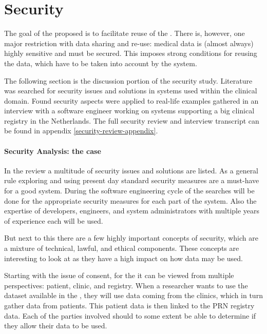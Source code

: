 \section{Security}
\label{security}

The goal of the proposed \ivfsystem{} is to facilitate reuse of the \projectdata{}.
There is, however, one major restriction with data sharing and re-use: medical data is (almost always) highly sensitive and must be secured. 
This imposes strong conditions for reusing the data, which have to be taken into account by the system.

The following section is the discussion portion of the security study.
Literature was searched for security issues and solutions in systems used within the clinical domain.
Found security aspects were applied to real-life examples gathered in an interview with a software engineer working on systems supporting a big clinical registry in the Netherlands.
The full security review and interview transcript can be found in appendix \ref{security-review-appendix}.

\paragraph{Security Analysis: the \ivfsystem{} case}
\label{security-summarisation-analysis}

In the review a multitude of security issues and solutions are listed.
As a general rule exploring and using present day standard security measures are a must-have for a good system.
During the software engineering cycle of the \ivfsystem{} searches will be done for the appropriate security measures for each part of the system.
Also the expertise of developers, engineers, and system administrators with multiple years of experience each will be used.

But next to this there are a few highly important concepts of security, which are a mixture of technical, lawful, and ethical components.
These concepts are interesting to look at as they have a high impact on how data may be used.

Starting with the issue of consent, for the \project{} it can be viewed from multiple perspectives: patient, clinic, and registry.
When a researcher wants to use the dataset available in the \ivfsystem{}, they will use data coming from the clinics, which in turn gather data from patients.
This patient data is then linked to the PRN registry data.
Each of the parties involved should to some extent be able to determine if they allow their data to be used.

